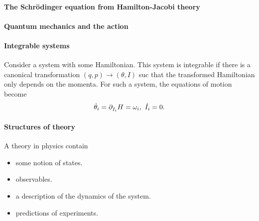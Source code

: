 
\paragraph{The Schrödinger equation from Hamilton-Jacobi theory}

\paragraph{Quantum mechanics and the action}

\paragraph{Integrable systems}
Consider a system with some Hamiltonian. This system is integrable if there is a canonical transformation $(q, p)\to (\theta, I)$ suc that the transformed Hamiltonian only depends on the momenta. For such a system, the equations of motion become
\begin{align*}
	\dot{\theta}_{i} = \partial^{}_{I_{i}}H = \omega_{i},\ \dot{I}_{i} = 0.
\end{align*}

\paragraph{Structures of theory}
A theory in physics contain
\begin{itemize}
	\item some notion of states.
	\item observables.
	\item a description of the dynamics of the system.
	\item predictions of experiments.
\end{itemize}

